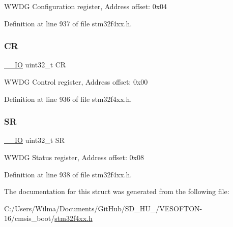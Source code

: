 W\+W\+DG Configuration register, Address offset\+: 0x04 

Definition at line 937 of file stm32f4xx.\+h.

\mbox{\label{struct_w_w_d_g___type_def_ab40c89c59391aaa9d9a8ec011dd0907a}} 
\subsubsection{\texorpdfstring{CR}{CR}}
{\footnotesize\ttfamily \hyperlink{group___c_m_s_i_s__core__definitions_gaec43007d9998a0a0e01faede4133d6be}{\+\_\+\+\_\+\+IO} uint32\+\_\+t CR}

W\+W\+DG Control register, Address offset\+: 0x00 

Definition at line 936 of file stm32f4xx.\+h.

\mbox{\label{struct_w_w_d_g___type_def_af6aca2bbd40c0fb6df7c3aebe224a360}} 
\subsubsection{\texorpdfstring{SR}{SR}}
{\footnotesize\ttfamily \hyperlink{group___c_m_s_i_s__core__definitions_gaec43007d9998a0a0e01faede4133d6be}{\+\_\+\+\_\+\+IO} uint32\+\_\+t SR}

W\+W\+DG Status register, Address offset\+: 0x08 

Definition at line 938 of file stm32f4xx.\+h.



The documentation for this struct was generated from the following file\+:\begin{DoxyCompactItemize}
\item 
C\+:/\+Users/\+Wilma/\+Documents/\+Git\+Hub/\+S\+D\+\_\+\+H\+U\+\_/\+V\+E\+S\+O\+F\+T\+O\+N-\/16/cmsis\+\_\+boot/\hyperlink{stm32f4xx_8h}{stm32f4xx.\+h}\end{DoxyCompactItemize}
